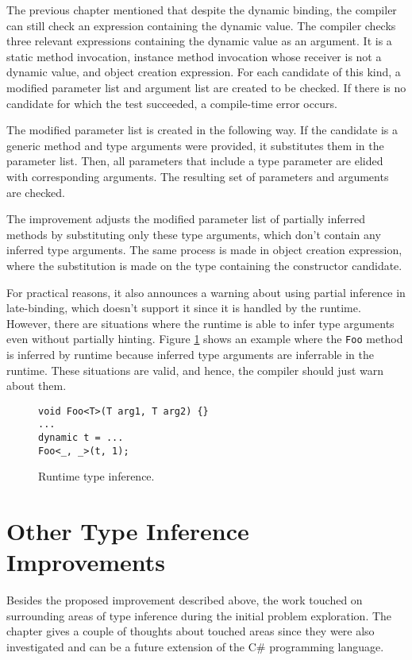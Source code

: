 The previous chapter mentioned that despite the dynamic binding, the compiler can still check an expression containing the dynamic value. 
The compiler checks three relevant expressions containing the dynamic value as an argument. 
It is a static method invocation, instance method invocation whose receiver is not a dynamic value, and object creation expression. 
For each candidate of this kind, a modified parameter list and argument list are created to be checked. 
If there is no candidate for which the test succeeded, a compile-time error occurs.
\par
The modified parameter list is created in the following way. 
If the candidate is a generic method and type arguments were provided, it substitutes them in the parameter list. 
Then, all parameters that include a type parameter are elided with corresponding arguments. 
The resulting set of parameters and arguments are checked.
\par
The improvement adjusts the modified parameter list of partially inferred methods by substituting only these type arguments, which don’t contain any inferred type arguments. 
The same process is made in object creation expression, where the substitution is made on the type containing the constructor candidate.
\par
For practical reasons, it also announces a warning about using partial inference in late-binding, which doesn’t support it since it is handled by the runtime. 
However, there are situations where the runtime is able to infer type arguments even without partially hinting. 
Figure \ref{img63:dinamic} shows an example where the \texttt{Foo} method is inferred by runtime because inferred type arguments are inferrable in the runtime. 
These situations are valid, and hence, the compiler should just warn about them.
\begin{figure}[h!]
\begin{lstlisting}[style=csharp, mathescape=true]
void Foo<T>(T arg1, T arg2) {}
...
dynamic t = ...
Foo<_, _>(t, 1);
\end{lstlisting}
\caption{Runtime type inference.}
\label{img63:dinamic}
\end{figure}

\section{Other Type Inference Improvements}

Besides the proposed improvement described above, the work touched on surrounding areas of type inference during the initial problem exploration. 
The chapter gives a couple of thoughts about touched areas since they were also investigated and can be a future extension of the C\# programming language.


